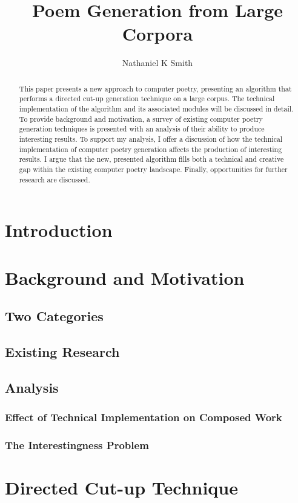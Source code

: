 \documentclass[10pt]{article}
\title{Poem Generation from Large Corpora}
\author{Nathaniel K Smith}
\begin{document}
\maketitle

\begin{abstract}
This paper presents a new approach to computer poetry, presenting an algorithm
that performs a directed cut-up generation technique on a large corpus. The
technical implementation of the algorithm and its associated modules will be
discussed in detail. To provide background and motivation, a survey of existing
computer poetry generation techniques is presented with an analysis of their
ability to produce interesting results. To support my analysis, I offer a
discussion of how the technical implementation of computer poetry generation
affects the production of interesting results. I argue that the new, presented
algorithm fills both a technical and creative gap within the existing computer
poetry landscape. Finally, opportunities for further research are discussed.
\end{abstract}

\section{Introduction}
\section{Background and Motivation}
\subsection{Two Categories}
\subsection{Existing Research}
\subsection{Analysis}
\subsubsection{Effect of Technical Implementation on Composed Work}
\subsubsection{The Interestingness Problem}
\section{Directed Cut-up Technique}
\end{document}
